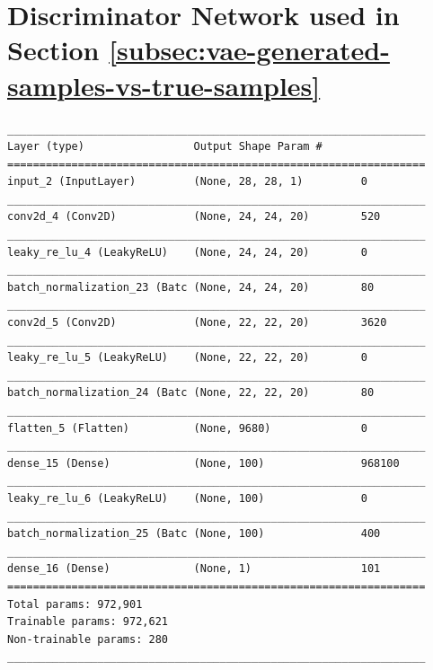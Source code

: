 \documentclass[11pt]{article}
\let\oldsection\section
\renewcommand\section{\clearpage\oldsection}
\begin{document}
\pagebreak

\section{Discriminator Network used in Section \ref{subsec:vae-generated-samples-vs-true-samples}}\label{sec:listing_discriminator_network}
\begin{lstlisting}[caption={The discriminator network used to distinguish generated \ac{VAE}/\ac{VLAE} samples from true \textsc{MNIST} images.},captionpos=b]
_________________________________________________________________
Layer (type)                 Output Shape Param #
=================================================================
input_2 (InputLayer)         (None, 28, 28, 1)         0
_________________________________________________________________
conv2d_4 (Conv2D)            (None, 24, 24, 20)        520
_________________________________________________________________
leaky_re_lu_4 (LeakyReLU)    (None, 24, 24, 20)        0
_________________________________________________________________
batch_normalization_23 (Batc (None, 24, 24, 20)        80
_________________________________________________________________
conv2d_5 (Conv2D)            (None, 22, 22, 20)        3620
_________________________________________________________________
leaky_re_lu_5 (LeakyReLU)    (None, 22, 22, 20)        0
_________________________________________________________________
batch_normalization_24 (Batc (None, 22, 22, 20)        80
_________________________________________________________________
flatten_5 (Flatten)          (None, 9680)              0
_________________________________________________________________
dense_15 (Dense)             (None, 100)               968100
_________________________________________________________________
leaky_re_lu_6 (LeakyReLU)    (None, 100)               0
_________________________________________________________________
batch_normalization_25 (Batc (None, 100)               400
_________________________________________________________________
dense_16 (Dense)             (None, 1)                 101
=================================================================
Total params: 972,901
Trainable params: 972,621
Non-trainable params: 280
_________________________________________________________________
\end{lstlisting}


\newpage
\end{document}
